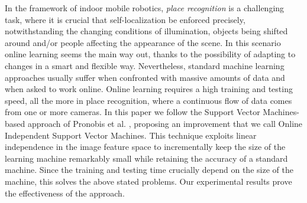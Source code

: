 In the framework of indoor mobile robotics, \emph{place recognition}
is a challenging task, where it is crucial that self-localization be
enforced precisely, notwithstanding the changing conditions of
illumination, objects being shifted around and/or people affecting the
appearance of the scene. In this scenario online learning seems the
main way out, thanks to the possibility of adapting to changes in a
smart and flexible way. Nevertheless, standard machine learning
approaches usually suffer when confronted with massive amounts of data
and when asked to work online. Online learning requires a high
training and testing speed, all the more in place recognition, where a
continuous flow of data comes from one or more cameras. In this paper
we follow the Support Vector Machines-based approach of Pronobis et
al. \cite{pronobis:iros06}, proposing an improvement that we call
Online Independent Support Vector Machines. This technique exploits
linear independence in the image feature space to incrementally keep
the size of the learning machine remarkably small while retaining the
accuracy of a standard machine. Since the training and testing time
crucially depend on the size of the machine, this solves the above
stated problems. Our experimental results prove the effectiveness of
the approach.
